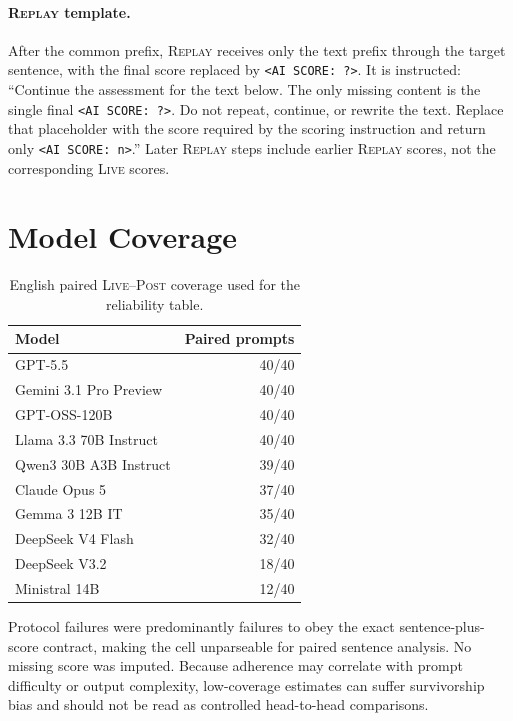 \documentclass[10pt]{article}
\newcommand{\live}{\textsc{Live}}
\newcommand{\replay}{\textsc{Replay}}
\newcommand{\post}{\textsc{Post}}
\newcommand{\papersection}[1]{\Needspace{4.4\baselineskip}\section{#1}}
\begin{document}
\paragraph{\replay{} template.}
After the common prefix, \replay{} receives only the text prefix through the target sentence, with the final score replaced by \texttt{<AI SCORE: ?>}. It is instructed: ``Continue the assessment for the text below. The only missing content is the single final \texttt{<AI SCORE: ?>}. Do not repeat, continue, or rewrite the text. Replace that placeholder with the score required by the scoring instruction and return only \texttt{<AI SCORE: n>}.'' Later \replay{} steps include earlier \replay{} scores, not the corresponding \live{} scores.

\papersection{Model Coverage}
\label{app:coverage}
\begin{table}[H]
\centering
\small
\setlength{\tabcolsep}{4pt}
\caption{English paired \live{}--\post{} coverage used for the reliability table.}
\begin{tabular}{lr}
\toprule
Model & Paired prompts \\
\midrule
GPT-5.5 & 40/40 \\
Gemini 3.1 Pro Preview & 40/40 \\
GPT-OSS-120B & 40/40 \\
Llama 3.3 70B Instruct & 40/40 \\
Qwen3 30B A3B Instruct & 39/40 \\
Claude Opus 5 & 37/40 \\
Gemma 3 12B IT & 35/40 \\
DeepSeek V4 Flash & 32/40 \\
DeepSeek V3.2 & 18/40 \\
Ministral 14B & 12/40 \\
\bottomrule
\end{tabular}
\end{table}
Protocol failures were predominantly failures to obey the exact sentence-plus-score contract, making the cell unparseable for paired sentence analysis. No missing score was imputed. Because adherence may correlate with prompt difficulty or output complexity, low-coverage estimates can suffer survivorship bias and should not be read as controlled head-to-head comparisons.
\end{document}
